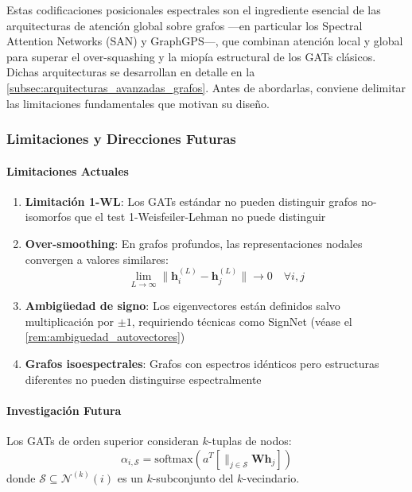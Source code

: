 Estas codificaciones posicionales espectrales son el ingrediente esencial de las arquitecturas de atención global sobre grafos —en particular los Spectral Attention Networks (SAN) y GraphGPS—, que combinan atención local y global para superar el over-squashing y la miopía estructural de los \glspl{GAT} clásicos. Dichas arquitecturas se desarrollan en detalle en la \autoref{subsec:arquitecturas_avanzadas_grafos}. Antes de abordarlas, conviene delimitar las limitaciones fundamentales que motivan su diseño.

\subsubsection{Limitaciones y Direcciones Futuras}\label{subsubsec:limitaciones_gat}

\paragraph{Limitaciones Actuales}

\begin{enumerate}
    \item \textbf{Limitación 1-WL}: Los GATs estándar no pueden distinguir grafos no-isomorfos que el test 1-Weisfeiler-Lehman no puede distinguir

    \item \textbf{Over-smoothing}: En grafos profundos, las representaciones nodales convergen a valores similares:
    \begin{equation}
        \lim_{L \to \infty} \|\mathbf{h}_i^{(L)} - \mathbf{h}_j^{(L)}\| \to 0 \quad \forall i,j
        \label{eq:over_smoothing_limit}
    \end{equation}

    \item \textbf{Ambigüedad de signo}: Los eigenvectores están definidos salvo multiplicación por $\pm 1$, requiriendo técnicas como SignNet (véase el \autoref{rem:ambiguedad_autovectores})

    \item \textbf{Grafos isoespectrales}: Grafos con espectros idénticos pero estructuras diferentes no pueden distinguirse espectralmente
\end{enumerate}

\paragraph{Investigación Futura}

\begin{definition}\label{def:higher_order_gat}
Los GATs de orden superior consideran $k$-tuplas de nodos:
\begin{equation}
    \alpha_{i,\mathcal{S}} = \text{softmax}\left(a^T\left[\|_{j \in \mathcal{S}} \mathbf{W}\mathbf{h}_j\right]\right)
    \label{eq:higher_order_gat}
\end{equation}
donde $\mathcal{S} \subseteq \mathcal{N}^{(k)}(i)$ es un $k$-subconjunto del $k$-vecindario.
\end{definition}

